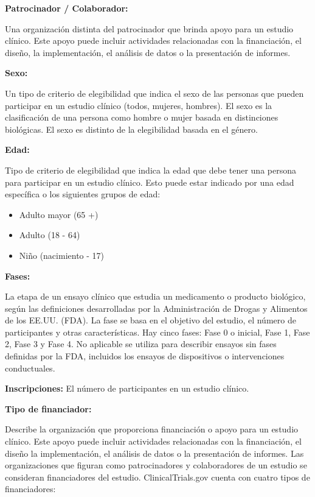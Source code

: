 \documentclass[
]{article}
\begin{document}
\textbf{Patrocinador / Colaborador:}

Una organización distinta del patrocinador que brinda apoyo para un
estudio clínico. Este apoyo puede incluir actividades relacionadas con
la financiación, el diseño, la implementación, el análisis de datos o la
presentación de informes.

\textbf{Sexo:}

Un tipo de criterio de elegibilidad que indica el sexo de las personas
que pueden participar en un estudio clínico (todos, mujeres, hombres).
El sexo es la clasificación de una persona como hombre o mujer basada en
distinciones biológicas. El sexo es distinto de la elegibilidad basada
en el género.

\textbf{Edad:}

Tipo de criterio de elegibilidad que indica la edad que debe tener una
persona para participar en un estudio clínico. Esto puede estar indicado
por una edad específica o los siguientes grupos de edad:

\begin{itemize}
\item
  Adulto mayor (65 +)
\item
  Adulto (18 - 64)
\item
  Niño (nacimiento - 17)
\end{itemize}

\textbf{Fases:}

La etapa de un ensayo clínico que estudia un medicamento o producto
biológico, según las definiciones desarrolladas por la Administración de
Drogas y Alimentos de los EE.UU. (FDA). La fase se basa en el objetivo
del estudio, el número de participantes y otras características. Hay
cinco fases: Fase 0 o inicial, Fase 1, Fase 2, Fase 3 y Fase 4. No
aplicable se utiliza para describir ensayos sin fases definidas por la
FDA, incluidos los ensayos de dispositivos o intervenciones
conductuales.

\textbf{Inscripciones:} El número de participantes en un estudio
clínico.

\textbf{Tipo de financiador:}

Describe la organización que proporciona financiación o apoyo para un
estudio clínico. Este apoyo puede incluir actividades relacionadas con
la financiación, el diseño la implementación, el análisis de datos o la
presentación de informes. Las organizaciones que figuran como
patrocinadores y colaboradores de un estudio se consideran financiadores
del estudio. ClinicalTrials.gov cuenta con cuatro tipos de
financiadores:
\end{document}
